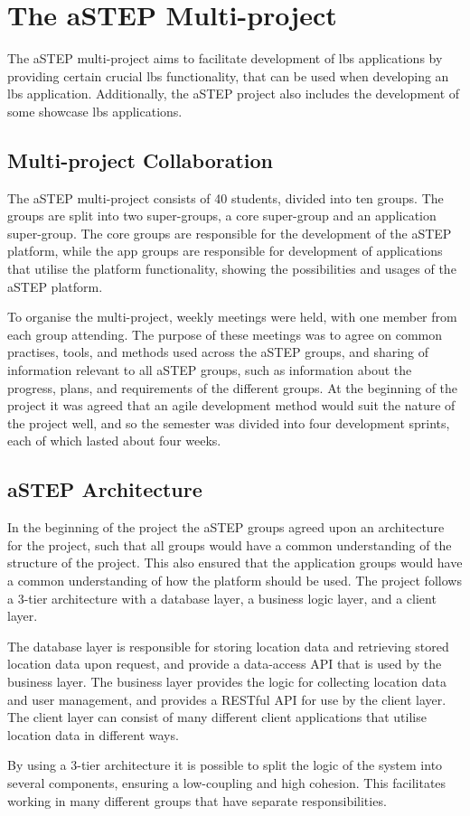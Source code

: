 \section{The aSTEP Multi-project} \label{sec:astep}
The aSTEP multi-project aims to facilitate development of \gls{lbs} applications by providing certain crucial \gls{lbs} functionality, that can be used when developing an \gls{lbs} application. Additionally, the aSTEP project also includes the development of some showcase \gls{lbs} applications.

\subsection{Multi-project Collaboration}
The aSTEP multi-project consists of 40 students, divided into ten groups. The groups are split into two super-groups, a core super-group and an application super-group. The core groups are responsible for the development of the aSTEP platform, while the app groups are responsible for development of applications that utilise the platform functionality, showing the possibilities and usages of the aSTEP platform. 

To organise the multi-project, weekly meetings were held, with one member from each group attending. The purpose of these meetings was to agree on common practises, tools, and methods used across the aSTEP groups, and sharing of information relevant to all aSTEP groups, such as information about the progress, plans, and requirements of the different groups. At the beginning of the project it was agreed that an agile development method would suit the nature of the project well, and so the semester was divided into four development sprints, each of which lasted about four weeks.

\subsection{aSTEP Architecture}
In the beginning of the project the aSTEP groups agreed upon an architecture for the project, such that all groups would have a common understanding of the structure of the project. This also ensured that the application groups would have a common understanding of how the platform should be used. The project follows a 3-tier architecture with a database layer, a business logic layer, and a client layer.

The database layer is responsible for storing location data and retrieving stored location data upon request, and provide a data-access API that is used by the business layer. The business layer provides the logic for collecting location data and user management, and provides a RESTful API for use by the client layer. The client layer can consist of many different client applications that utilise location data in different ways.

By using a 3-tier architecture it is possible to split the logic of the system into several components, ensuring a low-coupling and high cohesion. This facilitates working in many different groups that have separate responsibilities.